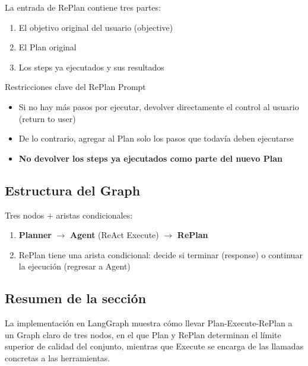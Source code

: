 La entrada de RePlan contiene tres partes:
\begin{enumerate}
    \item El objetivo original del usuario (objective)
    \item El Plan original
    \item Los steps ya ejecutados y sus resultados
\end{enumerate}

\begin{warningbox}{Restricciones clave del RePlan Prompt}
\begin{itemize}
    \item Si no hay más pasos por ejecutar, devolver directamente el control al usuario (return to user)
    \item De lo contrario, agregar al Plan solo los pasos que todavía deben ejecutarse
    \item \textbf{No devolver los steps ya ejecutados como parte del nuevo Plan}
\end{itemize}
\end{warningbox}

\subsection{Estructura del Graph}

Tres nodos + aristas condicionales:
\begin{enumerate}
    \item \textbf{Planner} $\rightarrow$ \textbf{Agent} (ReAct Execute) $\rightarrow$ \textbf{RePlan}
    \item RePlan tiene una arista condicional: decide si terminar (response) o continuar la ejecución (regresar a Agent)
\end{enumerate}

\subsection{Resumen de la sección}

La implementación en LangGraph muestra cómo llevar Plan-Execute-RePlan a un Graph claro de tres nodos, en el que Plan y RePlan determinan el límite superior de calidad del conjunto, mientras que Execute se encarga de las llamadas concretas a las herramientas.

